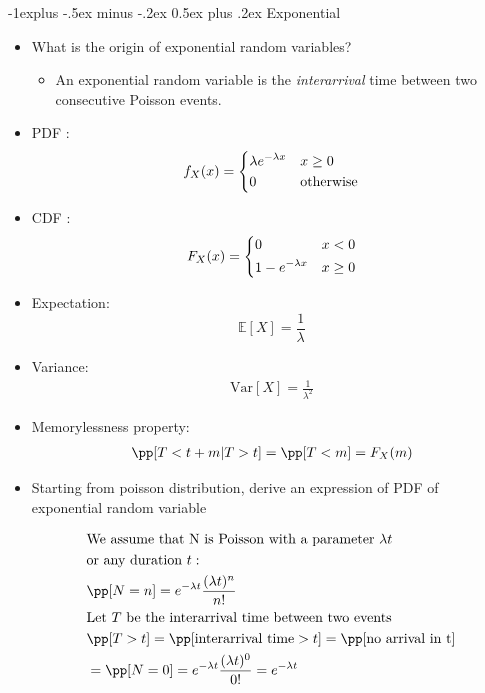 \documentclass[10pt,landscape]{article}
\makeatletter
\renewcommand{\subsection}{\@startsection{subsection}{2}{0mm}%
                                {-1explus -.5ex minus -.2ex}%
                                {0.5ex plus .2ex}%
                                {\normalfont\normalsize\bfseries}}
\makeatother
\begin{document}
\begin{multicols*}{3}
\subsection{Exponential} 
\begin{itemize}

\item What is the origin of exponential random variables?
\begin{itemize}
\item An exponential random variable is the \emph{interarrival} time between two consecutive
Poisson events.

\end{itemize}

\item PDF :
$$ f_X(x) =
\begin{dcases}
\lambda e ^{-\lambda x} & x \geq 0\\
0 & \text{otherwise}\\
\end{dcases}
$$



\item CDF :
$$ F_X(x) =
\begin{dcases}
0 & x < 0\\
1- e^{-\lambda x} & x \geq 0\\
\end{dcases}
$$



\item Expectation:
$$ \mathbb{E}[X] = \frac{1}{\lambda} $$

\item Variance:
\begin{align*}
\text{Var}[X] = \frac{1}{\lambda^2}
\end{align*}

\item Memorylessness property:
\begin{align*}
\pp[T< t+m | T>t] = \pp[T<m] = F_X(m)
\end{align*}

\item Starting from poisson distribution, derive an expression of PDF of exponential random variable

\begin{align*}
&\text{We assume that N is Poisson with a parameter }\lambda t \, \\ & \text{or any duration }t : \\
&\pp[N=n]=e^{-\lambda t} \frac{(\lambda t) ^n}{n!}\\
&\text{Let $T$ be the interarrival time between two events}\\
&\pp[T>t] = \pp[\text{interarrival time}>t] = \pp[\text{no arrival in t}]\\& = \pp[N=0]=e^{-\lambda t} \frac{(\lambda t) ^0}{0!} = e^{- \lambda t}
\end{align*}


\end{itemize}
\end{multicols*}
\end{document}
